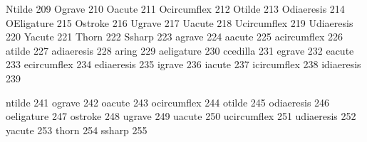  Ntilde          209
 Ograve          210
 Oacute          211
 Ocircumflex     212
 Otilde          213
 Odiaeresis      214
 OEligature      215
 Ostroke         216
 Ugrave          217
 Uacute          218
 Ucircumflex     219
 Udiaeresis      220
 Yacute          221
 Thorn           222
 Ssharp          223  
 agrave          224
 aacute          225
 acircumflex     226
 atilde          227
 adiaeresis      228
 aring           229
 aeligature      230
 ccedilla        231
 egrave          232
 eacute          233
 ecircumflex     234
 ediaeresis      235
 igrave          236
 iacute          237
 icircumflex     238
 idiaeresis      239

 ntilde          241
 ograve          242
 oacute          243
 ocircumflex     244
 otilde          245
 odiaeresis      246
 oeligature      247
 ostroke         248
 ugrave          249
 uacute          250
 ucircumflex     251
 udiaeresis      252
 yacute          253
 thorn           254 
 ssharp          255  

\stopencoding

\endinput

